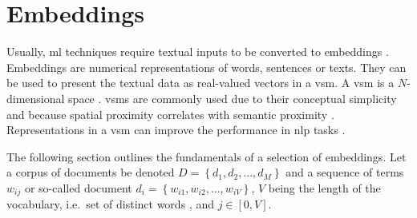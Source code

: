 \section{Embeddings}\label{sec:embeddings}

Usually, \ac{ml} techniques require textual inputs to be converted to embeddings \cite{SentRep2014}.
Embeddings are numerical representations of words, sentences or texts.
They can be used to present the textual data as real-valued vectors in a \ac{vsm}.
A \ac{vsm} is a $N$-dimensional space \cite{soft_cosine2014}.
\acp{vsm} are commonly used due to their conceptual simplicity and because spatial proximity correlates with semantic proximity 
\cite{tfidf2008, UniversalSentEnc2018, HfsentTrans2019, Top2Vec2020}.
Representations in a \ac{vsm} can improve the performance in \ac{nlp} tasks \cite{SkipGram2013}.

The following section outlines the fundamentals of a selection of embeddings.
Let a corpus of documents be denoted $D= \left\{d_1, d_2, ..., d_M  \right\}$ 
and a sequence of terms $w_{ij}$ or so-called document $d_i = \left\{w_{i1}, w_{i2}, ..., w_{iV}  \right\}$, 
$V$ being the length of the vocabulary, 
i.e.\ set of distinct words \cite{clusteringDocs2020}, and $j \in [0, V]$.










